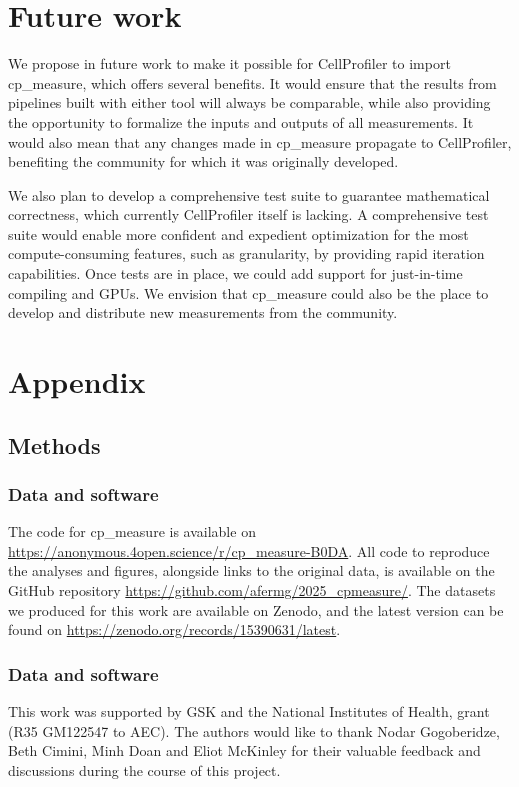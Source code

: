 \documentclass{article}
\begin{document}
\section{Future work}
\label{sec:org5cdbb12}
We propose in future work to make it possible for CellProfiler to import cp\_measure, which offers several benefits. It would ensure that the results from pipelines built with either tool will always be comparable, while also providing the opportunity to formalize the inputs and outputs of all measurements. It would also mean that any changes made in cp\_measure propagate to CellProfiler, benefiting the community for which it was originally developed.

We also plan to develop a comprehensive test suite to guarantee mathematical correctness, which currently CellProfiler itself is lacking. A comprehensive test suite would enable more confident and expedient optimization for the most compute-consuming features, such as granularity, by providing rapid iteration capabilities. Once tests are in place, we could add support for just-in-time compiling and GPUs. We envision that cp\_measure could also be the place to develop and distribute new measurements from the community. 



\section{Appendix}
\label{sec:orgdd18dd8}
\subsection{Methods}
\label{sec:orgb3e9382}
\subsubsection{Data and software}
\label{sec:orgbda0ae2}
The code for cp\_measure is available on \url{https://anonymous.4open.science/r/cp\_measure-B0DA}. All code to reproduce the analyses and figures, alongside links to the original data, is available on the GitHub repository \url{https://github.com/afermg/2025\_cpmeasure/}. The datasets we produced for this work are available on Zenodo, and the latest version can be found on \url{https://zenodo.org/records/15390631/latest}.
\subsubsection{Data and software}
\label{sec:acknowledgements}

This work was supported by GSK and the National Institutes of Health, grant (R35 GM122547 to AEC). The authors would like to thank Nodar Gogoberidze, Beth Cimini, Minh Doan and Eliot McKinley for their valuable feedback and discussions during the course of this project.
\end{document}

